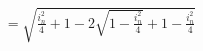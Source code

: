 \documentclass[preview]{standalone}
\begin{document}
\begin{align*}
= \sqrt{\frac{i_n^2}{4} + 1 - 2\sqrt{1 - \frac{i_n^2}{4}} + 1 - \frac{i_n^2}{4}}
\end{align*}
\end{document}

